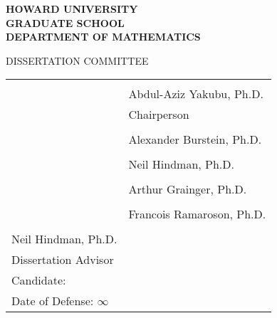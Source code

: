 \newcommand{\approval}{
  \clearpage
  \begin{center}
    \textbf{HOWARD UNIVERSITY} \\
    \textbf{GRADUATE SCHOOL} \\
    \textbf{DEPARTMENT OF MATHEMATICS} \\ \vspace{1em}
    
    DISSERTATION COMMITTEE
  \end{center}

  \newcommand{\sigline}{\makebox[3in]{\hrulefill}}

  \vspace{4em}
  
  \begin{tabular}{@{}l @{}l}
    \hspace{15em} & \sigline \\
    \hspace{15em} & Abdul-Aziz Yakubu, Ph.D. \\
    \hspace{15em} & Chairperson \vspace{4em} \\
    \hspace{15em} & \sigline \\
    \hspace{15em} & Alexander Burstein, Ph.D.  \vspace{4em} \\
    \hspace{15em} & \sigline \\
    \hspace{15em} & Neil Hindman, Ph.D.  \vspace{4em} \\
    \hspace{15em} & \sigline \\
    \hspace{15em} & Arthur Grainger, Ph.D. \vspace{4em} \\
    \hspace{15em} & \sigline \\
    \hspace{15em} & Francois Ramaroson, Ph.D. \vspace{4em} \\
    
    \sigline & \\
    Neil Hindman, Ph.D. & \\
    Dissertation Advisor & \vspace{2em} \\

    Candidate: \author & \vspace{2em} \\
    Date of Defense: $\infty$
  \end{tabular}
  
  \vfill
}

\thetitlepage
\approval